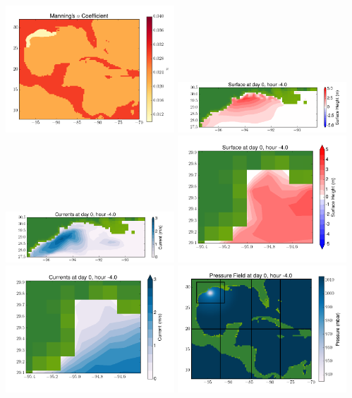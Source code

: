 \documentclass[11pt]{article}
\begin{document}
\vskip 10pt 
\includegraphics[width=0.475\textwidth]{frame0068fig3.png}
\includegraphics[width=0.475\textwidth]{frame0068fig4.png}
\vskip 10pt 
\includegraphics[width=0.475\textwidth]{frame0068fig5.png}
\includegraphics[width=0.475\textwidth]{frame0068fig6.png}
\vskip 10pt 
\includegraphics[width=0.475\textwidth]{frame0068fig7.png}
\includegraphics[width=0.475\textwidth]{frame0068fig8.png}
\end{document}
